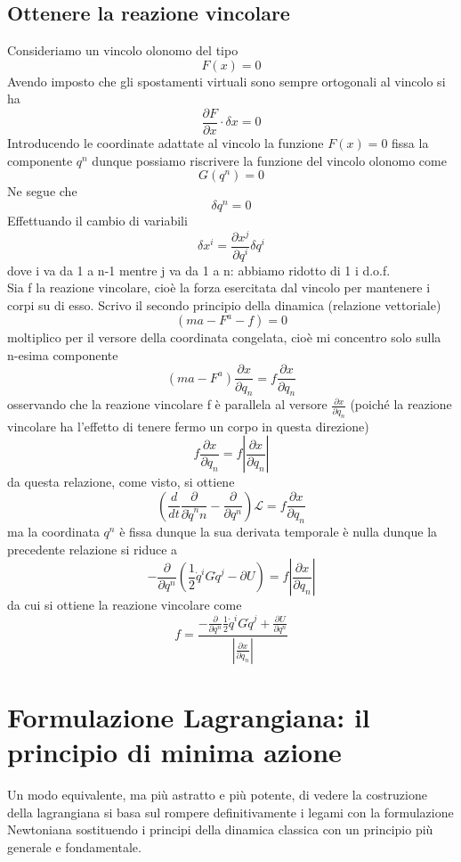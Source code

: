 \documentclass[
10pt, %
a4paper, %
oneside, %
headinclude,footinclude, %
BCOR5mm, %
]{scrartcl}
\begin{document}
\subsection{Ottenere la reazione vincolare}
Consideriamo un vincolo olonomo del tipo
\[F(x) = 0\]
Avendo imposto che gli spostamenti virtuali sono sempre ortogonali al vincolo si ha
\[\frac{\partial F}{\partial x}\cdot \delta x = 0\]
Introducendo le coordinate adattate al vincolo la funzione \(F(x) = 0\) fissa la componente \(q^n\) dunque possiamo riscrivere la funzione del vincolo olonomo come
\[G(q^n) = 0\]
Ne segue che
\[\delta q^n = 0\]
Effettuando il cambio di variabili
\[\delta x^i = \frac{\partial x^j}{\partial q^i}\delta q^i\]
dove i va da 1 a n-1 mentre j va da 1 a n: abbiamo ridotto di 1 i d.o.f.\\
Sia f la reazione vincolare, cioè la forza esercitata dal vincolo per mantenere i corpi su di esso. Scrivo il secondo principio della dinamica (relazione vettoriale)
\[(ma-F^a-f)= 0\]
moltiplico per il versore della coordinata congelata, cioè mi concentro solo sulla n-esima componente
\[(ma-F^a)\frac{\partial x}{\partial q_n}= f\frac{\partial x}{\partial q_n}\]
osservando che la reazione vincolare f è parallela al versore \(\frac{\partial x}{\partial q_n}\) (poiché la reazione vincolare ha l'effetto di tenere fermo un corpo in questa direzione)
\[f\frac{\partial x}{\partial q_n} = f|\frac{\partial x}{\partial q_n}|\]
da questa relazione, come visto, si ottiene
\[\left(\frac{d}{dt}\frac{\partial}{\partial \dot{q}^nn}-\frac{\partial}{\partial q^n}\right)\mathcal{L} = f\frac{\partial x}{\partial q_n}\]
ma la coordinata \(q^n\) è fissa dunque la sua derivata temporale è nulla dunque la precedente relazione si riduce a
\[-\frac{\partial }{\partial q^n}\left(\frac{1}{2}\dot{q}^iG\dot{q}^j-\partial U\right) = f|\frac{\partial x}{\partial q_n}|\]
da cui si ottiene la reazione vincolare come
\[f = \frac{-\frac{\partial }{\partial q^n}\frac{1}{2}\dot{q}^iG\dot{q}^j+\frac{\partial U}{\partial q^n}}{|\frac{\partial x}{\partial q_n}|}\]
\newpage
\section{Formulazione Lagrangiana: il principio di minima azione}
Un modo equivalente, ma più astratto e più potente, di vedere la costruzione della lagrangiana si basa sul rompere definitivamente i legami con la formulazione Newtoniana sostituendo i principi della dinamica classica con un principio più generale e fondamentale.
\end{document}
